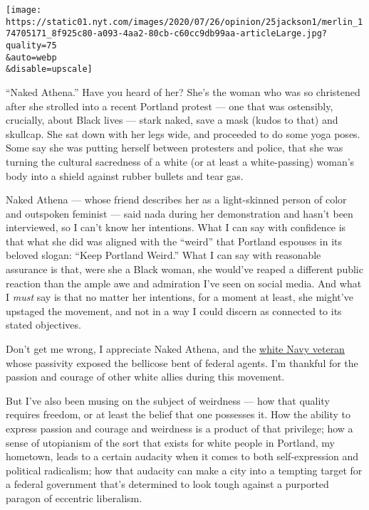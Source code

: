 \texttt{[image: https://static01.nyt.com/images/2020/07/26/opinion/25jackson1/merlin\_174705171\_8f925c80-a093-4aa2-80cb-c60cc9db99aa-articleLarge.jpg?quality=75\\\&auto=webp\\\&disable=upscale]}

``Naked Athena.'' Have you heard of her? She's the woman who was so
christened after she strolled into a recent Portland protest --- one
that was ostensibly, crucially, about Black lives --- stark naked, save
a mask (kudos to that) and skullcap. She sat down with her legs wide,
and proceeded to do some yoga poses. Some say she was putting herself
between protesters and police, that she was turning the cultural
sacredness of a white (or at least a white-passing) woman's body into a
shield against rubber bullets and tear gas.

Naked Athena --- whose friend describes her as a light-skinned person of
color and outspoken feminist --- said nada during her demonstration and
hasn't been interviewed, so I can't know her intentions. What I can say
with confidence is that what she did was aligned with the ``weird'' that
Portland espouses in its beloved slogan: ``Keep Portland Weird.'' What I
can say with reasonable assurance is that, were she a Black woman, she
would've reaped a different public reaction than the ample awe and
admiration I've seen on social media. And what I \emph{must} say is that
no matter her intentions, for a moment at least, she might've upstaged
the movement, and not in a way I could discern as connected to its
stated objectives.

Don't get me wrong, I appreciate Naked Athena, and the
\href{https://uk.reuters.com/article/uk-global-race-protests-portland-veteran/navy-veteran-says-he-was-beaten-like-a-punching-bag-in-portland-idUKKCN24L2DN}{white
Navy veteran} whose passivity exposed the bellicose bent of federal
agents. I'm thankful for the passion and courage of other white allies
during this movement.

But I've also been musing on the subject of weirdness --- how that
quality requires freedom, or at least the belief that one possesses it.
How the ability to express passion and courage and weirdness is a
product of that privilege; how a sense of utopianism of the sort that
exists for white people in Portland, my hometown, leads to a certain
audacity when it comes to both self-expression and political radicalism;
how that audacity can make a city into a tempting target for a federal
government that's determined to look tough against a purported paragon
of eccentric liberalism.

